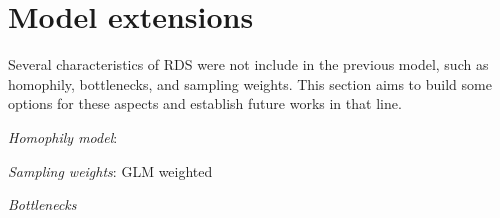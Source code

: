 \section{Model extensions}

Several characteristics of RDS were not include in the previous model, such as
homophily, bottlenecks, and sampling weights. This section aims to build some
options for these aspects and establish future works in that line.

\begin{alineas}
  \item {\em Homophily model}: \cite{yauck2021general}
  \item {\em Sampling weights}: GLM weighted
  \item {\em Bottlenecks}
\end{alineas}